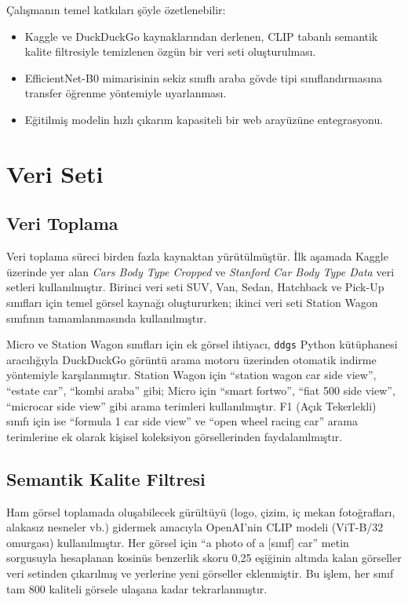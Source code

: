 \documentclass[conference]{IEEEtran}
\begin{document}
Çalışmanın temel katkıları şöyle özetlenebilir:
\begin{itemize}
  \item Kaggle ve DuckDuckGo kaynaklarından derlenen, CLIP tabanlı semantik
        kalite filtresiyle temizlenen özgün bir veri seti oluşturulması.
  \item EfficientNet-B0 mimarisinin sekiz sınıflı araba gövde tipi
        sınıflandırmasına transfer öğrenme yöntemiyle uyarlanması.
  \item Eğitilmiş modelin hızlı çıkarım kapasiteli bir web arayüzüne
        entegrasyonu.
\end{itemize}

\section{Veri Seti}

\subsection{Veri Toplama}

Veri toplama süreci birden fazla kaynaktan yürütülmüştür. İlk aşamada
Kaggle üzerinde yer alan \emph{Cars Body Type Cropped} \cite{boukhris2023cars}
ve \emph{Stanford Car Body Type Data} \cite{krause2013stanford} veri setleri
kullanılmıştır. Birinci veri seti SUV, Van, Sedan, Hatchback ve Pick-Up
sınıfları için temel görsel kaynağı oluştururken; ikinci veri seti
Station Wagon sınıfının tamamlanmasında kullanılmıştır.

Micro ve Station Wagon sınıfları için ek görsel ihtiyacı, \texttt{ddgs} Python
kütüphanesi aracılığıyla DuckDuckGo görüntü arama motoru üzerinden otomatik
indirme yöntemiyle karşılanmıştır. Station Wagon için ``station wagon car side
view'', ``estate car'', ``kombi araba'' gibi; Micro için ``smart fortwo'',
``fiat 500 side view'', ``microcar side view'' gibi arama terimleri
kullanılmıştır. F1 (Açık Tekerlekli) sınıfı için ise ``formula 1 car side
view'' ve ``open wheel racing car'' arama terimlerine ek olarak kişisel
koleksiyon görsellerinden faydalanılmıştır.

\subsection{Semantik Kalite Filtresi}

Ham görsel toplamada oluşabilecek gürültüyü (logo, çizim, iç mekan
fotoğrafları, alakasız nesneler vb.) gidermek amacıyla OpenAI'nin CLIP
\cite{radford2021learning} modeli (ViT-B/32 omurgası) kullanılmıştır. Her
görsel için ``a photo of a [sınıf] car'' metin sorgusuyla hesaplanan kosinüs
benzerlik skoru 0,25 eşiğinin altında kalan görseller veri setinden çıkarılmış
ve yerlerine yeni görseller eklenmiştir. Bu işlem, her sınıf tam 800 kaliteli
görsele ulaşana kadar tekrarlanmıştır.
\end{document}
